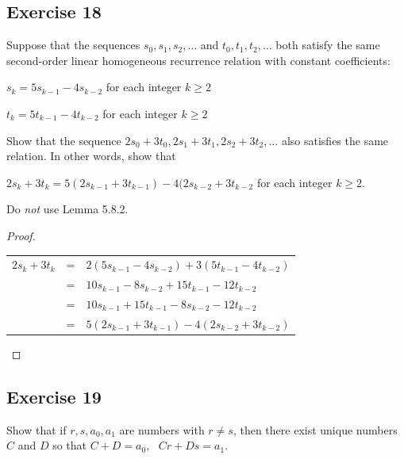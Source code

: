 \documentclass[14pt]{extarticle}
\begin{document}
\subsection{Exercise 18}
Suppose that the sequences \(s_0, s_1, s_2, \ldots\) and \(t_0, t_1, t_2, \ldots\) both satisfy the same second-order 
linear homogeneous recurrence relation with constant coefficients:

\(s_k = 5s_{k-1} - 4s_{k-2}\) for each integer \(k \geq 2\)

\(t_k = 5t_{k-1} - 4t_{k-2}\) for each integer \(k \geq 2\)

Show that the sequence \(2s_0 + 3t_0, 2s_1 + 3t_1, 2s_2 + 3t_2, \ldots\) also satisfies the same relation. 
In other words, show that

\(2s_k + 3t_k = 5(2s_{k-1} + 3t_{k-1}) - 4(2s_{k-2} + 3t_{k-2}\) for each integer \(k \geq 2\).

Do {\it not} use Lemma 5.8.2.

\begin{proof}
\begin{tabular}{rcl}
\(2s_k + 3t_k\) & = & \(2(5s_{k-1} - 4s_{k-2}) + 3(5t_{k-1} - 4t_{k-2})\) \\
& = & \(10s_{k-1} - 8s_{k-2} + 15t_{k-1} - 12t_{k-2}\) \\
& = & \(10s_{k-1} + 15t_{k-1} - 8s_{k-2} - 12t_{k-2}\) \\
& = & \(5(2s_{k-1} + 3t_{k-1}) - 4(2s_{k-2} + 3t_{k-2})\)
\end{tabular}
\end{proof}

\subsection{Exercise 19}
Show that if \(r, s, a_0, a_1\) are numbers with \(r \neq s\), then there exist unique numbers $C$ and $D$ so that 
\(C + D = a_0, \,\,\,\, Cr + Ds = a_1\).
\end{document}
